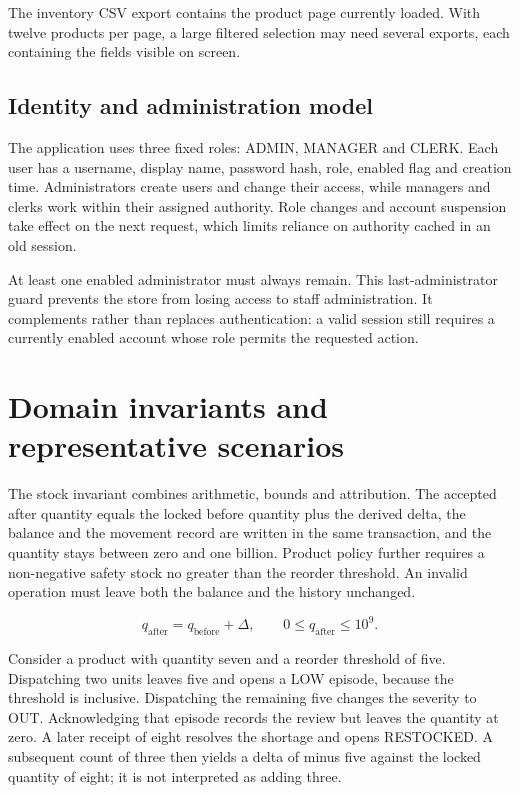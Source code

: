 The inventory CSV export contains the product page currently loaded. With twelve products per page, a large filtered selection may need several exports, each containing the fields visible on screen.


\subsection{Identity and administration model}

The application uses three fixed roles: ADMIN, MANAGER and CLERK. Each user has a username, display name, password hash, role, enabled flag and creation time. Administrators create users and change their access, while managers and clerks work within their assigned authority. Role changes and account suspension take effect on the next request, which limits reliance on authority cached in an old session.


At least one enabled administrator must always remain. This last-administrator guard prevents the store from losing access to staff administration. It complements rather than replaces authentication: a valid session still requires a currently enabled account whose role permits the requested action.


\FloatBarrier

\section{Domain invariants and representative scenarios}

The stock invariant combines arithmetic, bounds and attribution. The accepted after quantity equals the locked before quantity plus the derived delta, the balance and the movement record are written in the same transaction, and the quantity stays between zero and one billion. Product policy further requires a non-negative safety stock no greater than the reorder threshold. An invalid operation must leave both the balance and the history unchanged.


\begin{equation}q_{\mathrm{after}}=q_{\mathrm{before}}+\Delta,\qquad 0\leq q_{\mathrm{after}}\leq 10^9.\end{equation}

Consider a product with quantity seven and a reorder threshold of five. Dispatching two units leaves five and opens a LOW episode, because the threshold is inclusive. Dispatching the remaining five changes the severity to OUT. Acknowledging that episode records the review but leaves the quantity at zero. A later receipt of eight resolves the shortage and opens RESTOCKED. A subsequent count of three then yields a delta of minus five against the locked quantity of eight; it is not interpreted as adding three.


